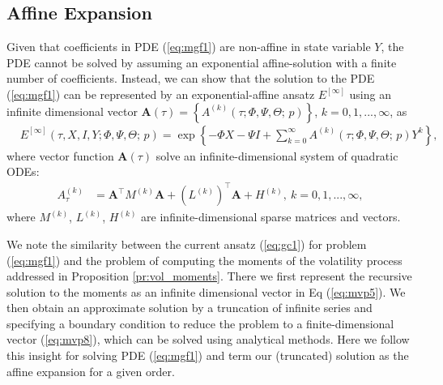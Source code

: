 \documentclass[11pt,a4paper] {article}
\begin{document}
\subsection{Affine Expansion}


Given that coefficients in PDE (\ref{eq:mgf1}) are non-affine in state variable $Y$, the PDE cannot be solved by assuming an exponential affine-solution with a finite number of coefficients. Instead, we can show that the solution to the PDE (\ref{eq:mgf1}) can be represented by an exponential-affine ansatz $E^{[\infty]}$ using an infinite dimensional vector $\mathbf{A}(\tau)=\left\{A^{(k)}(\tau;\Phi,\Psi,\Theta;\,p)\right\}$,  $k=0,1,...,\infty$, as
\begin{equation}\label{eq:gc1}
\begin{split}
& E^{[\infty]}(\tau,X,I,Y; \Phi,\Psi,\Theta;\,p)= \exp \left\{-\Phi X-\Psi I +  \sum^{\infty}_{k=0}A^{(k)}(\tau;\Phi,\Psi,\Theta;\,p)Y^{k}  \right\},
\end{split}
\end{equation}
where vector function $\mathbf{A}(\tau)$ solve an infinite-dimensional system of quadratic ODEs:
\begin{equation}
\begin{split}
A^{(k)}_\tau&=\mathbf{A}^\top M^{(k)}\mathbf{A} + \left(L^{(k)}\right)^\top\mathbf{A} + H^{(k)}, \ k=0,1,...,\infty,
\end{split}
\end{equation}
where $M^{(k)}$, $L^{(k)}$, $H^{(k)}$ are infinite-dimensional sparse matrices and vectors. 


We note the similarity between the current ansatz (\ref{eq:gc1}) for problem (\ref{eq:mgf1}) and the problem of computing the moments of the volatility process addressed in Proposition \ref{pr:vol_moments}. There we first represent the recursive solution to the moments as an infinite dimensional vector in Eq (\ref{eq:mvp5}). We then obtain an approximate solution by a truncation of infinite series and specifying a boundary condition to reduce the problem to a finite-dimensional vector (\ref{eq:mvp8}), which can be solved using analytical methods. Here we follow this insight for solving PDE (\ref{eq:mgf1}) and term our (truncated) solution as the affine expansion for a given order.
\end{document}
